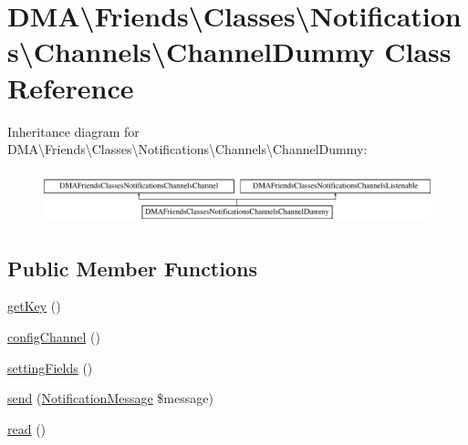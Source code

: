 \hypertarget{classDMA_1_1Friends_1_1Classes_1_1Notifications_1_1Channels_1_1ChannelDummy}{\section{D\+M\+A\textbackslash{}Friends\textbackslash{}Classes\textbackslash{}Notifications\textbackslash{}Channels\textbackslash{}Channel\+Dummy Class Reference}
\label{classDMA_1_1Friends_1_1Classes_1_1Notifications_1_1Channels_1_1ChannelDummy}
}
Inheritance diagram for D\+M\+A\textbackslash{}Friends\textbackslash{}Classes\textbackslash{}Notifications\textbackslash{}Channels\textbackslash{}Channel\+Dummy\+:\begin{figure}[H]
\begin{center}
\leavevmode
\includegraphics[height=1.530055cm]{df/dc6/classDMA_1_1Friends_1_1Classes_1_1Notifications_1_1Channels_1_1ChannelDummy}
\end{center}
\end{figure}
\subsection*{Public Member Functions}
\begin{DoxyCompactItemize}
\item 
\hyperlink{classDMA_1_1Friends_1_1Classes_1_1Notifications_1_1Channels_1_1ChannelDummy_a5c05bb750adc6c6daf381fe947efa15c}{get\+Key} ()
\item 
\hyperlink{classDMA_1_1Friends_1_1Classes_1_1Notifications_1_1Channels_1_1ChannelDummy_a3e250544631beeb6eca62c50be68ba10}{config\+Channel} ()
\item 
\hyperlink{classDMA_1_1Friends_1_1Classes_1_1Notifications_1_1Channels_1_1ChannelDummy_a69940e85c68e7d14c44c708eb59cbcb0}{setting\+Fields} ()
\item 
\hyperlink{classDMA_1_1Friends_1_1Classes_1_1Notifications_1_1Channels_1_1ChannelDummy_a204876b56d42c1fc9c8fedee59a4c42c}{send} (\hyperlink{classDMA_1_1Friends_1_1Classes_1_1Notifications_1_1NotificationMessage}{Notification\+Message} \$message)
\item 
\hyperlink{classDMA_1_1Friends_1_1Classes_1_1Notifications_1_1Channels_1_1ChannelDummy_a97f9f10a70e2b6274f6b3898fc03ea10}{read} ()
\end{DoxyCompactItemize}


